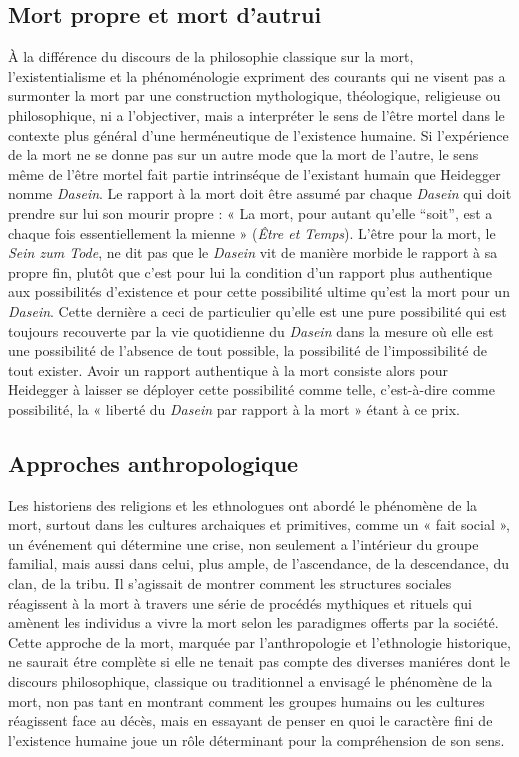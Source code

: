 \subsection{Mort propre et mort d'autrui}

À la différence du discours de la philosophie classique sur la mort, l'existentialisme et la phénoménologie expriment des courants qui ne visent pas a surmonter la mort par une construction mythologique, théologique, religieuse ou philosophique, ni a l'objectiver, mais a interpréter le sens de l'être mortel dans le contexte plus général d'une herméneutique de l'existence humaine. Si l'expérience de la mort ne se donne pas sur un autre mode que la mort de l'autre, le sens même de l'être mortel fait partie intrinséque de l'existant humain que Heidegger nomme {\it Dasein}. Le rapport à la mort doit être assumé par chaque {\it Dasein} qui doit prendre sur lui son mourir propre : « La mort, pour autant qu'elle “soit”, est a chaque fois essentiellement la mienne » ({\it Être et Temps}). L'être pour la mort, le {\it Sein zum Tode}, ne dit pas que le {\it Dasein} vit de manière morbide le rapport à sa propre fin, plutôt que c'est pour lui la condition d'un rapport plus authentique aux possibilités d'existence et pour cette possibilité ultime qu'est la mort pour un {\it Dasein}.
Cette dernière a ceci de particulier qu'elle est une pure possibilité qui est toujours recouverte par la vie quotidienne du {\it Dasein} dans la mesure où elle est une possibilité de l'absence de tout possible, la possibilité de l'impossibilité de tout exister. Avoir un rapport authentique à la mort consiste alors pour Heidegger à laisser se déployer cette possibilité comme telle, c'est-à-dire comme possibilité, la « liberté du {\it Dasein} par rapport à la mort » étant à ce prix.

\subsection{Approches anthropologique}

Les historiens des religions et les ethnologues ont abordé le phénomène de la mort, surtout dans les cultures archaiques et primitives, comme un « fait social », un événement qui détermine une crise, non seulement a l'intérieur du groupe familial, mais aussi dans celui, plus ample, de l'ascendance, de la descendance, du clan, de la tribu. Il s'agissait de montrer comment les structures sociales réagissent à la mort à travers une série de procédés mythiques et rituels qui amènent les individus a vivre la mort selon les paradigmes offerts par la société. Cette approche de la mort, marquée par l'anthropologie et l'ethnologie historique, ne saurait étre complète si elle ne tenait pas compte des  diverses maniéres dont le discours philosophique, classique ou traditionnel a envisagé le phénomène de la mort, non pas tant en montrant comment les groupes humains ou les cultures réagissent face au décès, mais en essayant de penser en quoi le caractère fini de l'existence humaine joue un rôle déterminant pour la compréhension de son sens.

